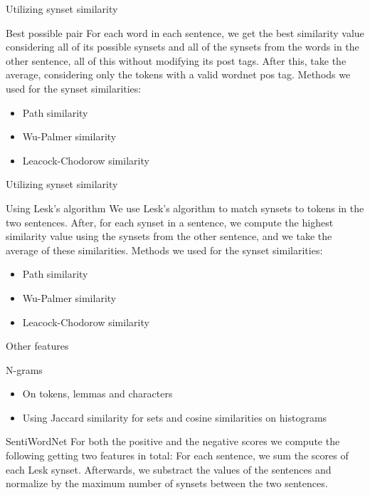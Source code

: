 \documentclass{beamer}
\begin{document}
\begin{frame}{Utilizing synset similarity}
    \begin{block}{Best possible pair}
        For each word in each sentence, we get the best similarity value considering all of its possible synsets and all of the synsets from the words in the other sentence, all of this without modifying its post tags. After this, take the average, considering only the tokens with a valid wordnet pos tag.
        Methods we used for the synset similarities: 
        \begin{itemize}
            \item Path similarity
            \item Wu-Palmer similarity
            \item Leacock-Chodorow similarity
        \end{itemize}
    \end{block}
     
\end{frame}
\begin{frame}{Utilizing synset similarity}
    \begin{block}{Using Lesk's algorithm}
        We use Lesk's algorithm to match synsets to tokens in the two sentences.
        After, for each synset in a sentence, we compute the highest similarity value using the synsets from the other sentence, and we take the average of these similarities.
        Methods we used for the synset similarities: 
        \begin{itemize}
            \item Path similarity
            \item Wu-Palmer similarity
            \item Leacock-Chodorow similarity
        \end{itemize}
    \end{block}
\end{frame}

\begin{frame}{Other features}
    \begin{block}{N-grams}
        \begin{itemize}
            \item On tokens, lemmas and characters
            \item Using Jaccard similarity for sets and cosine similarities on histograms
        \end{itemize}
    \end{block}
    \begin{block}{SentiWordNet}
        For both the positive and the negative scores we compute the following getting two features in total:
        For each sentence, we sum the scores of each Lesk synset. Afterwards, we substract the values of the sentences and normalize by the maximum number of synsets between the two sentences.
    \end{block}
\end{frame}
\end{document}
